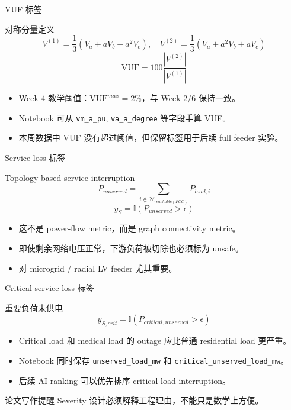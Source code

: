 \documentclass[aspectratio=169,11pt]{beamer}
\begin{document}
\begin{frame}{VUF 标签}
\begin{block}{对称分量定义}
\[
V^{(1)}=\frac{1}{3}\left(V_a+aV_b+a^2V_c\right),\quad
V^{(2)}=\frac{1}{3}\left(V_a+a^2V_b+aV_c\right)
\]
\[
\mathrm{VUF}=100\frac{|V^{(2)}|}{|V^{(1)}|}
\]
\end{block}
\begin{itemize}
  \item Week 4 教学阈值：$\mathrm{VUF}^{max}=2\%$，与 Week 2/6 保持一致。
  \item Notebook 可从 \texttt{vm\_a\_pu}, \texttt{va\_a\_degree} 等字段手算 VUF。
  \item 本周数据中 VUF 没有超过阈值，但保留标签用于后续 full feeder 实验。
\end{itemize}
\end{frame}

\begin{frame}{Service-loss 标签}
\begin{block}{Topology-based service interruption}
\[
P_{unserved}=\sum_{i\notin\mathcal{N}_{reachable(PCC)}} P_{load,i}
\]
\[
y_S=\mathbb{I}(P_{unserved}>\epsilon)
\]
\end{block}
\begin{itemize}
  \item 这不是 power-flow metric，而是 graph connectivity metric。
  \item 即使剩余网络电压正常，下游负荷被切除也必须标为 unsafe。
  \item 对 microgrid / radial LV feeder 尤其重要。
\end{itemize}
\end{frame}

\begin{frame}{Critical service-loss 标签}
\begin{block}{重要负荷未供电}
\[
y_{S,crit}=\mathbb{I}(P_{critical,unserved}>\epsilon)
\]
\end{block}
\begin{itemize}
  \item Critical load 和 medical load 的 outage 应比普通 residential load 更严重。
  \item Notebook 同时保存 \texttt{unserved\_load\_mw} 和 \texttt{critical\_unserved\_load\_mw}。
  \item 后续 AI ranking 可以优先排序 critical-load interruption。
\end{itemize}
\begin{alertblock}{论文写作提醒}
Severity 设计必须解释工程理由，不能只是数学上方便。
\end{alertblock}
\end{frame}
\end{document}
